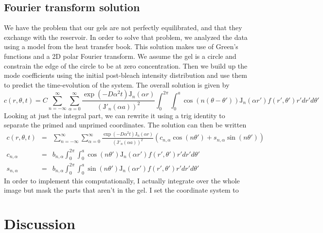 \subsection{Fourier transform solution}

We have the problem that our gels are not perfectly equilibrated, and that they exchange with the reservoir.  In order to solve that problem, we analyzed the data using a model from the heat transfer book.  This solution makes use of Green's functions and a 2D polar Fourier transform.  We assume the gel is a circle and constrain the edge of the circle to be at zero concentration.  Then we build up the mode coefficients using the initial post-bleach intensity distribution and use them to predict the time-evolution of the system.  The overall solution is given by
\begin{equation}
c(r,\theta,t) = C\sum_{n=-\infty}^{\infty} \sum_{\alpha = 0}^\infty   \frac{\exp\left(-D\alpha^2t\right)\mathrm{J}_n\left(\alpha r\right)}{\left(\mathrm{J'}_n(\alpha a)\right)^2} \int_0^{2\pi} \int_0^a \cos\left(n(\theta-\theta')\right) \mathrm{J}_n(\alpha r') f(r',\theta') r' dr' d\theta'
\end{equation}
Looking at just the integral part, we can rewrite it using a trig identity to separate the primed and unprimed coordinates.  The solution can then be written
\begin{eqnarray}
c(r,\theta,t) &=& \sum_{n=-\infty}^{\infty} \sum_{\alpha = 0}^\infty   \frac{\exp\left(-D\alpha^2t\right)\mathrm{J}_n\left(\alpha r\right)}{\left(\mathrm{J'}_n(\alpha a)\right)^2} \left(c_{n,\alpha}\cos(n\theta') + s_{n,\alpha} \sin(n\theta')\right) \\
c_{n,\alpha} & = &b_{n,\alpha} \int_0^{2\pi} \int_0^a \cos\left(n\theta'\right) \mathrm{J}_n(\alpha r')f(r',\theta') r' dr' d\theta'\\
s_{n,\alpha} & = & b_{n,\alpha}\int_0^{2\pi} \int_0^a \sin\left(n\theta'\right) \mathrm{J}_n(\alpha r') f(r',\theta') r' dr' d\theta'
\end{eqnarray}
In order to implement this computationally, I actually integrate over the whole image but mask the parts that aren't in the gel.  I set the coordinate system to 

\section{Discussion}